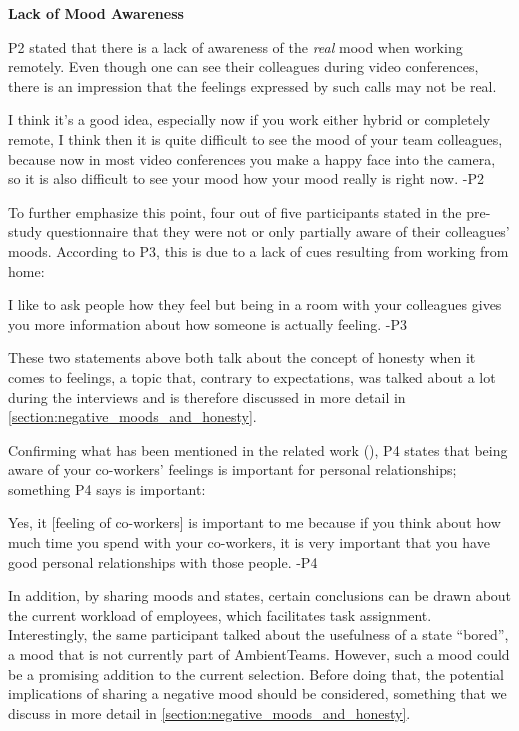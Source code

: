 \bigskip\noindent\textbf{Lack of Mood Awareness}

\medskip\noindent P2 stated that there is a lack of awareness of the \textit{real} mood when working remotely. Even though one can see their colleagues during video conferences, there is an impression that the feelings expressed by such calls may not be real.

\begin{displayquote}
    I think it's a good idea, especially now if you work either hybrid or completely remote, I think then it is quite difficult to see the mood of your team colleagues, because now in most video conferences you make a happy face into the camera, so it is also difficult to see your mood how your mood really is right now. -P2
\end{displayquote}

To further emphasize this point, four out of five participants stated in the pre-study questionnaire that they were not or only partially aware of their colleagues' moods. According to P3, this is due to a lack of cues resulting from working from home:

\begin{displayquote}
    I like to ask people how they feel but being in a room with your colleagues gives you more information about how someone is actually feeling. -P3
\end{displayquote}

These two statements above both talk about the concept of honesty when it comes to feelings, a topic that, contrary to expectations, was talked about a lot during the interviews and is therefore discussed in more detail in \autoref{section:negative_moods_and_honesty}.

Confirming what has been mentioned in the related work (\autocite{grant2013exploration, kuwabara2002connectedness}), P4 states that being aware of your co-workers' feelings is important for personal relationships; something P4 says is important:

\begin{displayquote}
    Yes, it [feeling of co-workers] is important to me because if you think about how much time you spend with your co-workers, it is very important that you have good personal relationships with those people. -P4
\end{displayquote}

In addition, by sharing moods and states, certain conclusions can be drawn about the current workload of employees, which facilitates task assignment. Interestingly, the same participant talked about the usefulness of a state \enquote{bored}, a mood that is not currently part of AmbientTeams. However, such a mood could be a promising addition to the current selection. Before doing that, the potential implications of sharing a negative mood should be considered, something that we discuss in more detail in \autoref{section:negative_moods_and_honesty}.

